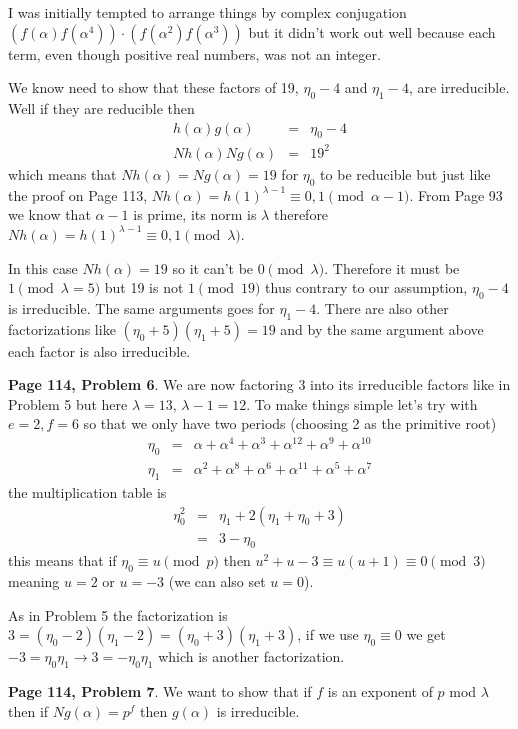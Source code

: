 \documentclass[aps,preprint,preprintnumbers,nofootinbib,showpacs,prd]{revtex4-1}
\newcommand{\nbea}{\begin{eqnarray*}}
\newcommand{\neea}{\end{eqnarray*}}
\begin{document}
I was initially tempted to arrange things by complex conjugation $(f(\alpha)f(\alpha^4)) \cdot (f(\alpha^2)f(\alpha^3))$ but it didn't work out well because each term, even though positive real numbers, was not an integer.

We know need to show that these factors of 19, $\eta_0 - 4$ and $\eta_1 - 4$, are irreducible. Well if they are reducible then
%
\nbea
h(\alpha) g(\alpha) & = & \eta_{0} - 4 \\
Nh(\alpha) Ng(\alpha) & = & 19^2
\neea
%
which means that $Nh(\alpha) = Ng(\alpha) = 19$ for $\eta_0$ to be reducible but just like the proof on Page 113, $Nh(\alpha) = h(1)^{\lambda - 1} \equiv 0,1 \pmod{\alpha - 1}$. From Page 93 we know that $\alpha - 1$ is prime, its norm is $\lambda$ therefore $Nh(\alpha) = h(1)^{\lambda - 1} \equiv 0,1 \pmod{\lambda}$.

In this case $Nh(\alpha) = 19$ so it can't be $0 \pmod{\lambda}$. Therefore it must be $1 \pmod{\lambda = 5}$ but 19 is not $1 \pmod{19}$ thus contrary to our assumption, $\eta_0 - 4$ is irreducible. The same arguments goes for $\eta_1 - 4$. There are also other factorizations like $(\eta_0 + 5)(\eta_1 + 5) = 19$ and by the same argument above each factor is also irreducible.

{\bf Page 114, Problem 6}. We are now factoring 3 into its irreducible factors like in Problem 5 but here $\lambda = 13$, $\lambda - 1 = 12$. To make things simple let's try with $e = 2, f = 6$ so that we only have two periods (choosing 2 as the primitive root)
%
\nbea
\eta_0 & = & \alpha + \alpha^{4} + \alpha^{3} + \alpha^{12}+ \alpha^{9}+ \alpha^{10}\\
\eta_1 & = & \alpha^2 + \alpha^8 + \alpha^6 + \alpha^{11} + \alpha^5 + \alpha^7
\neea
%
the multiplication table is
%
\nbea
\eta_0^2 & = & \eta_1 + 2(\eta_1 + \eta_0 + 3) \\
& = & 3 - \eta_0
\neea
%
this means that if $\eta_0 \equiv u \pmod{p}$ then $u^2 + u - 3 \equiv u(u+1) \equiv 0 \pmod{3}$ meaning $u = 2$ or $u = -3$ (we can also set $u = 0$).

As in Problem 5 the factorization is $3 = (\eta_0 - 2)(\eta_1 - 2) = (\eta_0 + 3)(\eta_1 + 3)$, if we use $\eta_0 \equiv 0$ we get $-3 = \eta_0 \eta_1 \to 3 = -\eta_0\eta_1$ which is another factorization.

{\bf Page 114, Problem 7}. We want to show that if $f$ is an exponent of $p$ mod $\lambda$ then if $Ng(\alpha) = p^f$ then $g(\alpha)$ is irreducible. 
\end{document}
